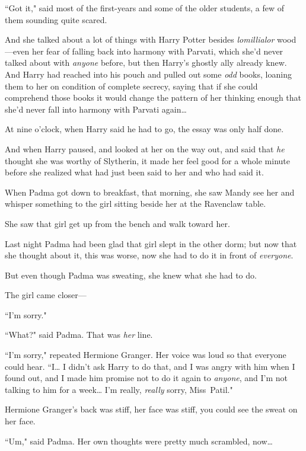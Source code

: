 ``Got it," said most of the first-years and some of the older students, a few of them sounding quite scared.

\later

And she talked about a lot of things with Harry Potter besides \emph{lomillialor} wood—even her fear of falling back into harmony with Parvati, which she'd never talked about with \emph{anyone} before, but then Harry's ghostly ally already knew. And Harry had reached into his pouch and pulled out some \emph{odd} books, loaning them to her on condition of complete secrecy, saying that if she could comprehend those books it would change the pattern of her thinking enough that she'd never fall into harmony with Parvati again{\ldots}

At nine o'clock, when Harry said he had to go, the essay was only half done.

And when Harry paused, and looked at her on the way out, and said that \emph{he} thought she was worthy of Slytherin, it made her feel good for a whole minute before she realized what had just been said to her and who had said it.

\later

When Padma got down to breakfast, that morning, she saw Mandy see her and whisper something to the girl sitting beside her at the Ravenclaw table.

She saw that girl get up from the bench and walk toward her.

Last night Padma had been glad that girl slept in the other dorm; but now that she thought about it, this was worse, now she had to do it in front of \emph{everyone}.

But even though Padma was sweating, she knew what she had to do.

The girl came closer—

``I'm sorry."

``What?" said Padma. That was \emph{her} line.

``I'm sorry," repeated Hermione Granger. Her voice was loud so that everyone could hear. ``I{\ldots} I didn't ask Harry to do that, and I was angry with him when I found out, and I made him promise not to do it again to \emph{anyone}, and I'm not talking to him for a week{\ldots} I'm really, \emph{really} sorry, Miss~Patil."

Hermione Granger's back was stiff, her face was stiff, you could see the sweat on her face.

``Um," said Padma. Her own thoughts were pretty much scrambled, now{\ldots}

